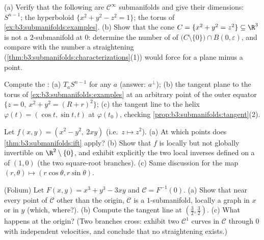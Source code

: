 \begin{exercise}[$\star$]\label{exo:b3:submanifolds:1}
(a) Verify that the following are $\mathcal C^\infty$
submanifolds and give their dimensions: $S^{n-1}$; the
hyperboloid $\{x^2 + y^2 - z^2 = 1\}$; the torus of
\cref{ex:b3:submanifolds:examples}.
(b) Show that the cone $C = \{x^2 + y^2 = z^2\} \subseteq
\R^3$ is not a $2$-submanifold at $0$: determine the number
of  of
$\bigl(C\setminus\{0\}\bigr)\cap B(0,\varepsilon)$, and
compare with the number a straightening
(\cref{thm:b3:submanifolds:characterizations}(1)) would
force for a plane minus a point.
\end{exercise}

\begin{exercise}[$\star$]\label{exo:b3:submanifolds:2}
Compute the :
(a) $T_aS^{n-1}$ for any $a$ (answer: $a^\perp$);
(b) the tangent plane to the torus of
\cref{ex:b3:submanifolds:examples} at an arbitrary point of
the outer equator $\{z = 0,\ x^2 + y^2 = (R + r)^2\}$;
(c) the tangent line to the helix $\varphi(t) = (\cos t,
\sin t, t)$ at $\varphi(t_0)$, checking
\cref{prop:b3:submanifolds:tangent}(2).
\end{exercise}

\begin{exercise}[$\star\star$]\label{exo:b3:submanifolds:3}
Let $f(x, y) = (x^2 - y^2,\ 2xy)$ (i.e.\ $z \mapsto z^2$).
(a) At which points does \cref{thm:b3:submanifolds:ift} apply?
(b) Show that $f$ is locally but not globally invertible on
$\R^2\setminus\{0\}$, and exhibit explicitly the two local
inverses defined on a  of $(1, 0)$ (the two
square-root branches).
(c) Same discussion for the  map $(r,
\theta) \mapsto (r\cos\theta, r\sin\theta)$.
\end{exercise}

\begin{exercise}[$\star\star$]\label{exo:b3:submanifolds:4}
(Folium) Let $F(x,y) = x^3 + y^3 - 3xy$ and $\mathcal C =
F^{-1}(0)$.
(a) Show that near every point of $\mathcal C$ other than the
origin, $\mathcal C$ is a $1$-submanifold, locally a graph in
$x$ or in $y$ (which, where?).
(b) Compute the tangent line at $(\frac32, \frac32)$.
(c) What happens at the origin? (Two branches cross:
exhibit two $\mathcal C^1$ curves in $\mathcal C$ through $0$
with independent velocities, and conclude that no
straightening exists.)
\end{exercise}

